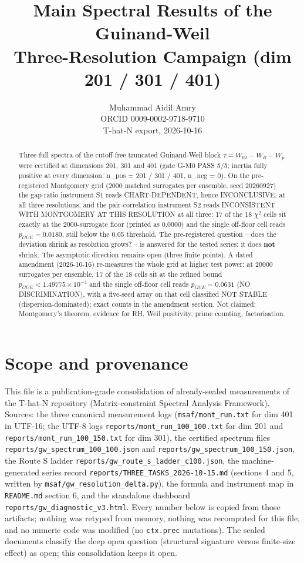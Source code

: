 \documentclass[11pt]{article}
\title{Main Spectral Results of the Guinand-Weil\\
Three-Resolution Campaign (dim 201 / 301 / 401)}
\author{Muhammad Aidil Amry\\ \small ORCID 0009-0002-9718-9710\\
\small T-hat-N export, 2026-10-16}
\date{}
\begin{document}
\maketitle

\begin{abstract}
\noindent Three full spectra of the cutoff-free truncated Guinand-Weil
block $\tau = W_{02} - W_R - W_p$ were certified at dimensions 201, 301
and 401 (gate G-M0 PASS 5/5; inertia fully positive at every dimension:
n\_pos = 201 / 301 / 401, n\_neg = 0). On the pre-registered Montgomery
grid (2000 matched surrogates per ensemble, seed 20260927) the gap-ratio
instrument S1 reads CHART-DEPENDENT, hence INCONCLUSIVE, at all three
resolutions, and the pair-correlation instrument S2 reads INCONSISTENT
WITH MONTGOMERY AT THIS RESOLUTION at all three: 17 of the 18 $\chi^2$
cells sit exactly at the 2000-surrogate floor (printed as 0.0000) and
the single off-floor cell reads $p_{GUE} = 0.0180$, still below the 0.05
threshold. The pre-registered question -- does the deviation shrink as
resolution grows? -- is answered for the tested series: it does
\textbf{not} shrink. The asymptotic direction remains open (three finite
points). A dated amendment (2026-10-16) re-measures the whole grid at
higher test power: at 20000 surrogates per ensemble, 17 of the 18 cells
sit at the refined bound $p_{GUE} < 1.49775\times 10^{-4}$ and the
single off-floor cell reads $p_{GUE} = 0.0631$ (NO DISCRIMINATION),
with a five-seed array on that cell classified NOT STABLE
(dispersion-dominated); exact counts in the amendment section. Not
claimed: Montgomery's theorem, evidence for RH, Weil positivity, prime
counting, factorisation.
\end{abstract}

\section{Scope and provenance}

This file is a publication-grade consolidation of already-sealed
measurements of the T-hat-N repository (Matrix-constraint Spectral
Analysis Framework). Sources: the three canonical measurement logs
(\texttt{msaf/mont\_run.txt} for dim 401 in UTF-16; the UTF-8 logs
\texttt{reports/mont\_run\_100\_100.txt} for dim 201 and
\texttt{reports/mont\_run\_100\_150.txt} for dim 301), the certified
spectrum files \texttt{reports/gw\_spectrum\_100\_100.json} and
\texttt{reports/gw\_spectrum\_100\_150.json}, the Route S ladder
\texttt{reports/gw\_route\_s\_ladder\_c100.json}, the machine-generated
series record \texttt{reports/THREE\_TASKS\_2026-10-15.md} (sections 4
and 5, written by \texttt{msaf/gw\_resolution\_delta.py}), the formula and
instrument map in \texttt{README.md} section 6, and the standalone
dashboard \texttt{reports/gw\_diagnostic\_v3.html}. Every number below is
copied from those artifacts; nothing was retyped from memory, nothing was
recomputed for this file, and no numeric code was modified (no
\texttt{ctx.prec} mutations). The sealed documents classify the deep
open question (structural signature versus finite-size effect) as open;
this consolidation keeps it open.
\end{document}
